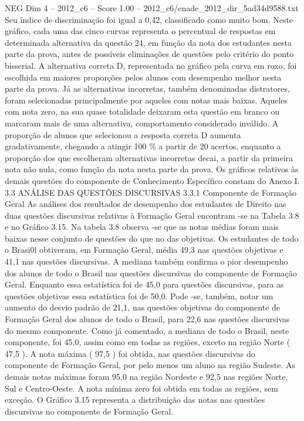 \begin{textsample}{NEG Dim 4 – 2012\_c6 – Score 1.00 – 2012\_c6/enade\_2012\_dir\_5ad34d9588.txt}
Seu índice de discriminação foi igual a 0,42, classificado como muito bom.
Neste gráfico, cada uma das cinco curvas representa o percentual de respostas em determinada alternativa da questão 24, em função da nota dos estudantes nesta parte da prova, antes de possíveis eliminações de questões pelo critério do ponto bisserial.
A alternativa correta D, representada no gráfico pela curva em roxo, foi escolhida em maiores proporções pelos alunos com desempenho melhor nesta parte da prova.
Já as alternativas incorretas, também denominadas distratores, foram selecionadas principalmente por aqueles com notas mais baixas.
Aqueles com nota zero, na sua quase totalidade deixaram esta questão em branco ou marcaram mais de uma alternativa, comportamento considerado inválido.
A proporção de alunos que selecionou a resposta correta D aumenta gradativamente, chegando a atingir 100 \% a partir de 20 acertos, enquanto a proporção dos que escolheram alternativas incorretas decai, a partir da primeira nota não nula, como função da nota nesta parte da prova.
Os gráficos relativos às demais questões do componente de Conhecimento Específico constam do Anexo I. 3.3 ANÁLISE DAS QUESTÕES DISCURSIVAS 3.3.1 Componente de Formação Geral As análises dos resultados de desempenho dos estudantes de Direito nas duas questões discursivas relativas à Formação Geral encontram -se na Tabela 3.8 e no Gráfico 3.15.
Na tabela 3.8 observa -se que as notas médias foram mais baixas nesse conjunto de questões do que no das objetivas.
Os estudantes de todo o Brasi0l obtiveram, em Formação Geral, média 49,3 nas questões objetivas e 41,1 nas questões discursivas.
A mediana também confirma o pior desempenho dos alunos de todo o Brasil nas questões discursivas do componente de Formação Geral.
Enquanto essa estatística foi de 45,0 para questões discursivas, para as questões objetivas essa estatística foi de 50,0.
Pode -se, também, notar um aumento do desvio padrão de 21,1, nas questões objetivas do componente de Formação Geral dos alunos de todo o Brasil, para 22,6 nas questões discursivas do mesmo componente.
Como já comentado, a mediana de todo o Brasil, neste componente, foi 45,0, assim como em todas as regiões, exceto na região Norte ( 47,5 ).
A nota máxima ( 97,5 ) foi obtida, nas questões discursivas do componente de Formação Geral, por pelo menos um aluno na região Sudeste.
As demais notas máximas foram 95,0 na região Nordeste e 92,5 nas regiões Norte, Sul e Centro-Oeste.
A nota mínima zero foi obtida em todas as regiões, sem exceção.
O Gráfico 3.15 representa a distribuição das notas nas questões discursivas no componente de Formação Geral.

\end{textsample}
